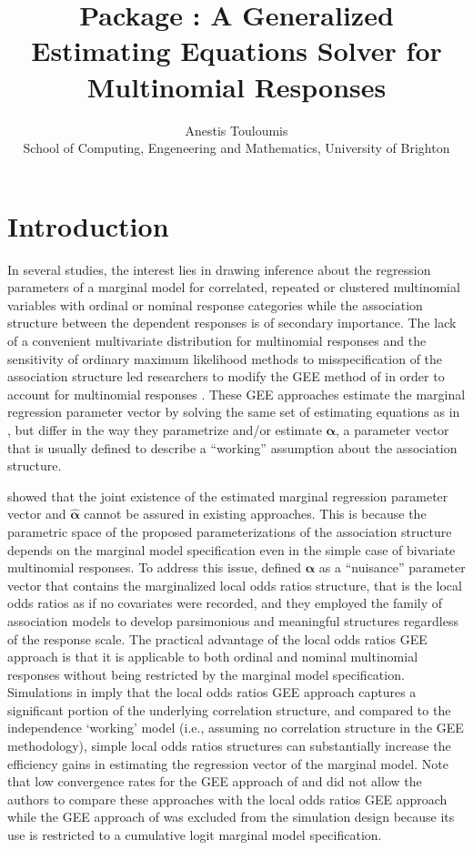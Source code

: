 \documentclass[article,shortnames,nojss]{jss}
\author{Anestis Touloumis\\ School of Computing, Engeneering and Mathematics, University of Brighton}
\title{\proglang{R} Package \pkg{multgee}: A Generalized Estimating Equations Solver for Multinomial Responses}
\begin{document}



\section{Introduction}
In several studies, the interest lies in drawing inference about the regression parameters of a marginal model for correlated, repeated or clustered multinomial variables with ordinal or nominal response categories while the association structure between the dependent responses is of secondary importance. The lack of a convenient multivariate distribution for multinomial responses and the sensitivity of ordinary maximum likelihood methods to misspecification of the association structure led researchers to modify the GEE method of \cite{Liang1986} in order to account for multinomial responses \citep{Miller1993,Lipsitz1994,Williamson1995,Lumley1996,Heagerty1996,Parsons2006}. These GEE approaches estimate the marginal regression parameter vector by solving the same set of estimating equations as in \cite{Liang1986}, but differ in the way they parametrize and/or estimate $\boldsymbol \alpha$, a parameter vector that is usually defined to describe a ``working'' assumption about the association structure. 

\cite{Touloumis2012} showed that the joint existence of the estimated marginal regression parameter vector and $\hat{\boldsymbol \alpha}$ cannot be assured in existing approaches. This is because the parametric space of the proposed parameterizations of the association structure depends on the marginal model specification even in the simple case of bivariate multinomial responses. To address this issue, \cite{Touloumis2012} defined $\boldsymbol \alpha$ as a ``nuisance'' parameter vector that contains the marginalized local odds ratios structure, that is the local odds ratios as if no covariates were recorded, and they employed the family of association models \citep{Goodman1985} to develop parsimonious and meaningful structures regardless of the response scale. The practical advantage of the local odds ratios GEE approach is that it is applicable to both ordinal and nominal multinomial responses without being restricted by the marginal model specification. Simulations in \cite{Touloumis2012} imply that the local odds ratios GEE approach captures a significant portion of the underlying correlation structure, and compared to the independence `working' model (i.e., assuming no correlation structure in the GEE methodology), simple local odds ratios structures can substantially increase the efficiency gains in estimating the regression vector of the marginal model. Note that low convergence rates for the GEE approach of \cite{Lumley1996} and \cite{Heagerty1996} did not allow the authors to compare these approaches with the local odds ratios GEE approach while the GEE approach of \cite{Parsons2006} was excluded from the simulation design because its use is restricted to a cumulative logit marginal model specification. 
\end{document}
